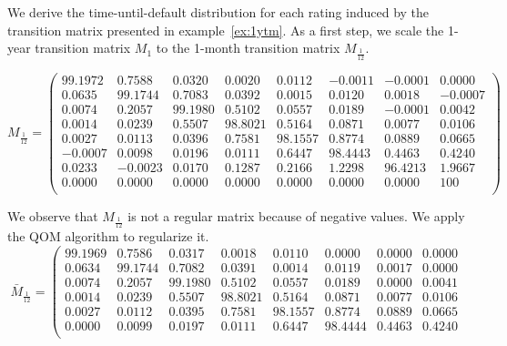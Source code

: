 \documentclass[11pt,fleqn]{book} %
\begin{document}
\begin{example}
	\label{ex:pdftm}
	We derive the time-until-default distribution for each rating induced by the 
	transition matrix presented in example~\ref{ex:1ytm}. As a first step, we 
	scale the 1-year transition matrix $M_1$ to the 1-month transition matrix 
	$M_{\frac{1}{12}}$.
	{\small
	\begin{displaymath}
		M_{\frac{1}{12}} = \left(
		\begin{array}{cccccccc}
			99.1972 &  0.7588 &  0.0320 &  0.0020 &  0.0112 & -0.0011 & -0.0001 &   0.0000 \\
			 0.0635 & 99.1744 &  0.7083 &  0.0392 &  0.0015 &  0.0120 &  0.0018 &  -0.0007 \\
			 0.0074 &  0.2057 & 99.1980 &  0.5102 &  0.0557 &  0.0189 & -0.0001 &   0.0042 \\
			 0.0014 &  0.0239 &  0.5507 & 98.8021 &  0.5164 &  0.0871 &  0.0077 &   0.0106 \\
			 0.0027 &  0.0113 &  0.0396 &  0.7581 & 98.1557 &  0.8774 &  0.0889 &   0.0665 \\
			-0.0007 &  0.0098 &  0.0196 &  0.0111 &  0.6447 & 98.4443 &  0.4463 &   0.4240 \\
			 0.0233 & -0.0023 &  0.0170 &  0.1287 &  0.2166 &  1.2298 & 96.4213 &   1.9667 \\
			 0.0000 &  0.0000 &  0.0000 &  0.0000 &  0.0000 &  0.0000 &  0.0000 & 100 \\
		\end{array}
		\right)
	\end{displaymath}\par}
	We observe that $M_{\frac{1}{12}}$ is not a regular matrix because of 
	negative values. We apply the QOM algorithm to regularize it.
	{\small
	\begin{displaymath}
		\bar{M}_{\frac{1}{12}} = \left(
		\begin{array}{cccccccc}
			99.1969 &  0.7586 &  0.0317 &  0.0018 &  0.0110 &  0.0000 &  0.0000 &   0.0000 \\
			 0.0634 & 99.1744 &  0.7082 &  0.0391 &  0.0014 &  0.0119 &  0.0017 &   0.0000 \\
			 0.0074 &  0.2057 & 99.1980 &  0.5102 &  0.0557 &  0.0189 &  0.0000 &   0.0041 \\
			 0.0014 &  0.0239 &  0.5507 & 98.8021 &  0.5164 &  0.0871 &  0.0077 &   0.0106 \\
			 0.0027 &  0.0112 &  0.0395 &  0.7581 & 98.1557 &  0.8774 &  0.0889 &   0.0665 \\
			 0.0000 &  0.0099 &  0.0197 &  0.0111 &  0.6447 & 98.4444 &  0.4463 &   0.4240 \\

\end{array}
\end{displaymath}}
\end{example}
\end{document}
